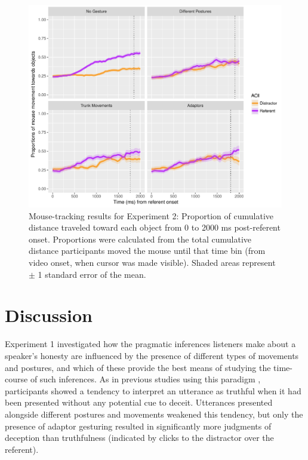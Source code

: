 \documentclass[a4paper,man,natbib]{apa6}
\begin{document}
\begin{figure}[Ht]
  \centering
	\includegraphics[width=\linewidth]{./img/e7_mouset.pdf}
  \caption{Mouse-tracking results for Experiment 2: Proportion of cumulative distance traveled toward each object from 0 to 2000 ms post-referent onset. Proportions were calculated from the total cumulative distance participants moved the mouse until that time bin (from video onset, when cursor was made visible). Shaded areas represent $\pm$ 1 standard error of the mean.}
  \label{fig:v1_mouse}
\end{figure}


\section{Discussion}
Experiment 1 investigated how the pragmatic inferences listeners make about a speaker's honesty are influenced by the presence of different types of movements and postures, and which of these provide the best means of studying the time-course of such inferences.
As in previous studies using this paradigm \citep{Loy2017, King2018}, participants showed a tendency to interpret an utterance as truthful when it had been presented without any potential cue to deceit.
Utterances presented alongside different postures and movements weakened this tendency, but only the presence of adaptor gesturing resulted in significantly more judgments of deception than truthfulness (indicated by clicks to the distractor over the referent).
\end{document}
